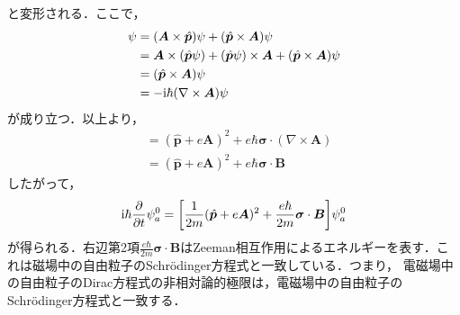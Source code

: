 \documentclass{report}
\begin{document}
と変形される．ここで，
\begin{align}
  [(\bm{A} \times \hat{\bm{p}}) + (\hat{\bm{p}} \times e\bm{A})]\psi &= (\bm{A} \times \hat{\bm{p}})\psi + (\hat{\bm{p}} \times \bm{A})\psi\\
  &= \bm{A} \times (\hat{\bm{p}}\psi) + (\hat{\bm{p}}\psi) \times \bm{A} + (\hat{\bm{p}} \times \bm{A})\psi\\
  &= (\hat{\bm{p}} \times \bm{A}) \psi\\
  &= -\i\hbar(\nabla \times \bm{A}) \psi
\end{align}
が成り立つ．以上より，
\begin{align}
  [\bm{\sigma}\cdot(\bm{p} + e\bm{A})][\bm{\sigma}\cdot(\bm{p} + e\bm{A})] &= (\hat{\bm{p}} + e\bm{A})^2 + e\hbar \bm{\sigma}\cdot(\nabla \times \bm{A})\\
  &= (\hat{\bm{p}} + e\bm{A})^2 + e\hbar \bm{\sigma} \cdot \bm{B}
\end{align}
したがって，
\begin{align}
  \mathrm{i}\hbar \frac{\partial}{\partial t} \psi_a^0 = \qty[\frac{1}{2m} (\hat{\bm{p}} + e\bm{A})^2 + \frac{e\hbar}{2m}\bm{\sigma}\cdot\bm{B}] \psi_a^0
\end{align}
が得られる．右辺第2項$\frac{e\hbar}{2m}\bm{\sigma}\cdot\bm{B}$はZeeman相互作用によるエネルギーを表す．これは磁場中の自由粒子のSchrödinger方程式と一致している．つまり，
電磁場中の自由粒子のDirac方程式の非相対論的極限は，電磁場中の自由粒子のSchrödinger方程式と一致する．
\end{document}
